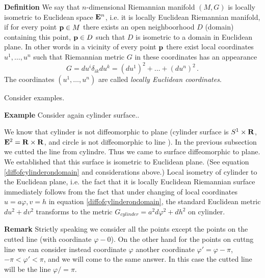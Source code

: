\documentclass[12pt]{article}
\theoremstyle{theorem}
\numberwithin{equation}{section}
\begin{document}
{\bf Definition} We say that $n$-dimensional Riemannian manifold
$(M,G)$ is locally isometric to Euclidean space ${\bf E}^n$,
i.e.  it is locally Euclidean Riemannian manifold,
if for every point ${\bf p}\in M$ there exists an  open
neighboorhood $D$ (domain) containing this point, ${\bf p}\in D$
such that $D$ is isometric to a domain in Euclidean plane. In other words
in a vicinity of every point ${\bf p}$ there exist local coordinates
$u^1,\dots,u^n$ such that Riemannian metric $G$ in
these coordinates has an appearance
            \begin{equation}\label{defofisometrytoEuclid}
           G=du^i\delta_{ik}du^k=(du^1)^2+\dots+(du^n)^2\,.
             \end{equation}
The coordinates $(u^1,\dots,u^n)$  are called
{\it locally Euclidean coordinates}.

\m






   Consider examples.

{\bf Example} Consider again cylinder surface..



 We know that cylinder is not diffeomorphic to plane
(cylinder surface is $S^1\times {\bf R}$, ${\bf E}^2={\bf R}\times {\bf R}$,
 and circle is not diffeomorphic to line ).
 In the previous subsection we cutted the line from cylindre.
Thus we came to surface diffeomorphic to plane. We established that
this surface is isometric to Euclidean plane. (See equation
 \eqref{diffofcylinderondomain} and considerations above.)
Local isometry of cylinder to the Euclidean plane, i.e. the fact
that it is locally Euclidean Riemannian surface
 immediately follows from the fact
that under changing of local coordinates $u=a\varphi, v=h$
  in equation \eqref{diffofcylinderondomain},
the standard Euclidean metric
$du^2+dv^2$ transforms to the metric
$G_{cylinder}=a^2d\varphi^2+dh^2$ on cylinder.

{\bf Remark} Strictly speaking we consider all the points
except the points on the cutted line (with coordinate $\varphi-0$).
On the other hand for the points on cuttng line we can consider
 instead coordinate $\varphi$ another coordinate $\varphi'=\varphi-\pi$,
  $-\pi<\varphi'<\pi$,
and we will come to the same answer. In this case the cutted line
will be the line $\varphi/=\pi$.

  \m
\end{document}
